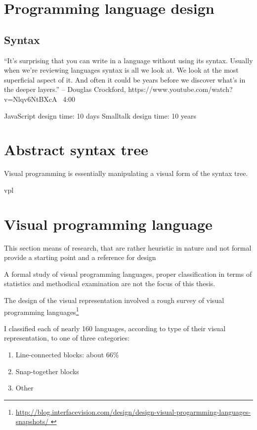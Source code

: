 \section{Programming language design}

\subsection{Syntax}

``It's surprising that you can write in a language without using its syntax. Usually when we're reviewing languages syntax is all we look at. We look at the most superficial aspect of it. And often it could be years before we discover what's in the deeper layers.''
-- Douglas Crockford, https://www.youtube.com/watch?v=Nlqv6NtBXcA ~4:00

JavaScript design time: 10 days
Smalltalk design time: 10 years


\section{Abstract syntax tree}

Visual programming is essentially manipulating a visual form of the syntax tree.

\acrlong{vpl}

\section{Visual programming language}
This section 
means of research, that are rather heuristic in nature and not formal
provide a starting point and a reference for design

A formal study of visual programming languages, proper classification in terms of statistics and methodical examination are not the focus of this thesis.

The design of the visual representation involved a rough survey of visual programming languages\footnote{\url{http://blog.interfacevision.com/design/design-visual-progarmming-languages-snapshots/ 
}}

I classified each of nearly 160 languages, according to type of their visual representation, to one of three categories:
\begin{enumerate}
    \item Line-connected blocks: about 66\%
    \item Snap-together blocks
    \item Other
\end{enumerate}

